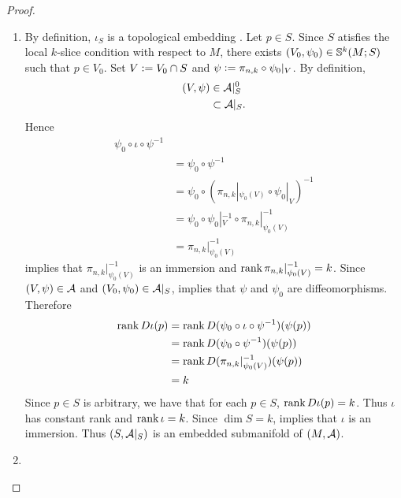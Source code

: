 \documentclass{book}
\begin{document}
	\begin{proof} \
		\begin{enumerate}
			\item By definition, $\iota_S$ is a topological embedding . Let $p \in S$. Since $S$ atisfies the local $k$-slice condition with respect to $M$, there exists $(V_0, \psi_0) \in \S^k(M; S)$ such that $p \in V_0$. Set $V \defeq V_0 \cap S$ and $\psi \defeq \pi_{n,k} \circ \psi_0|_V$. By definition,  
			\begin{align*}
				(V, \psi) 
				& \in \MA|_S^0 \\
				& \subset \MA|_S.
			\end{align*}
			Hence 
			\begin{align*}
				\psi_0 \circ \iota \circ \psi^{-1} \\
				& = \psi_0 \circ \psi^{-1} \\
				& = \psi_0 \circ (\pi_{n,k}|_{\psi_0(V)} \circ \psi_0|_V)^{-1} \\
				& = \psi_0 \circ \psi_0|_V^{-1} \circ \pi_{n,k}|_{\psi_0(V)}^{-1} \\
				& = \pi_{n,k}|_{\psi_0(V)}^{-1} 
			\end{align*}
			 implies that $\pi_{n,k}|_{\psi_0(V)}^{-1}$ is an immersion and $\rnk \pi_{n,k}|_{\psi_0(V)}^{-1} = k$. Since $(V, \psi) \in \MA$ and $(V_0, \psi_0) \in \MA|_S$,  implies that $\psi$ and $\psi_0$ are diffeomorphisms. Therefore
			\begin{align*}
				\rnk D \iota (p)
				& = \rnk D (\psi_0 \circ \iota \circ \psi^{-1})(\psi(p)) \\
				& = \rnk D (\psi_0 \circ \psi^{-1})(\psi(p)) \\
				& = \rnk D (\pi_{n,k}|_{\psi_0(V)}^{-1})(\psi(p)) \\
				& = k
			\end{align*}  
			Since $p \in S$ is arbitrary, we have that for each $p \in S$, $\rnk D \iota (p) = k$. Thus $\iota$ has constant rank and $\rnk \iota = k$. Since $\dim S = k$,  implies that $\iota$ is an immersion. Thus $(S, \MA|_S)$ is an embedded submanifold of $(M, \MA)$.
			\item \tcr{FINISH!!!} 
		\end{enumerate}
	\end{proof}
	
	
	
\end{document}
